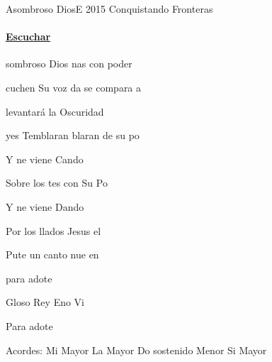 \documentclass[12pt, spanish]{book}
\begin{document}
    \begin{song}{Asombroso Dios}{E}
        {2015} %
        {Conquistando Fronteras}
        {} %
        {}
        \ifChordBk
        \paragraph{\mbox{}\hfill\protect\href{https://open.spotify.com/intl-es/track/4wHH2dqg7pwvjddGjNStnM}{Escuchar}\mbox{}\hfill}
        \fi


        \begin{SBOpGroup}
            sombroso Dios nas con poder

            cuchen Su voz da se compara a 

             levantará  la Oscuridad

            yes Temblaran blaran de su po
        \end{SBOpGroup}
        \vskip 20pt
        \begin{SBOpGroup}
            Y ne viene Cando

            Sobre los tes con Su Po

            Y ne viene Dando

            Por los llados Jesus el 
        \end{SBOpGroup}


        \begin{SBChorus}
            Pute un canto nue  en 

            para adote

            Gloso Rey Eno Vi

            Para adote
        \end{SBChorus}

        \ifChordBk
        \begin{SBOpGroup}
            Acordes:\break
            \upchord{\E}\qquad Mi Mayor \hfill
            \upchord{\A}\qquad La Mayor \hfill\null\break
            \upchord{\Csm}Do sostenido Menor \hfill
            \upchord{\B}\qquad\qquad Si Mayor \hfill\null\break
        \end{SBOpGroup}
        \fi
    \end{song}
\end{document}
